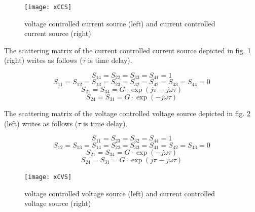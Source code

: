 \documentclass[10pt]{report}
\begin{document}
\begin{figure}[ht]
\begin{center}
\texttt{[image: xCCS]}
\end{center}
\caption{voltage controlled current source (left) and current controlled current source (right)}
\label{fig:xCCS}
\end{figure}
\FloatBarrier

The scattering matrix of the current controlled current source
depicted in fig. \ref{fig:xCCS} (right) writes as follows ($\tau$ is
time delay).

\begin{equation}
S_{14} = S_{22} = S_{33} = S_{41} = 1
\end{equation}
\begin{equation}
S_{11} = S_{12} = S_{13} = S_{23} = S_{32} = S_{42} = S_{43} = S_{44} = 0
\end{equation}
\begin{equation}
S_{21} = S_{34} = G\cdot \exp\left(j\pi-j\omega\tau\right)
\end{equation}
\begin{equation}
S_{24} = S_{31} = G\cdot \exp\left(-j\omega\tau\right)
\end{equation}

The scattering matrix of the voltage controlled voltage source
depicted in fig. \ref{fig:xCVS} (left) writes as follows ($\tau$ is
time delay).

\begin{equation}
S_{11} = S_{23} = S_{32} = S_{44} = 1
\end{equation}
\begin{equation}
S_{12} = S_{13} = S_{14} = S_{22} = S_{33} = S_{41} = S_{42} = S_{43} = 0
\end{equation}
\begin{equation}
S_{21} = S_{34} = G\cdot \exp\left(-j\omega\tau\right)
\end{equation}
\begin{equation}
S_{24} = S_{31} = G\cdot \exp\left(j\pi-j\omega\tau\right)
\end{equation}

\begin{figure}[ht]
\begin{center}
\texttt{[image: xCVS]}
\end{center}
\caption{voltage controlled voltage source (left) and current controlled voltage source (right)}
\label{fig:xCVS}
\end{figure}
\FloatBarrier
\end{document}
